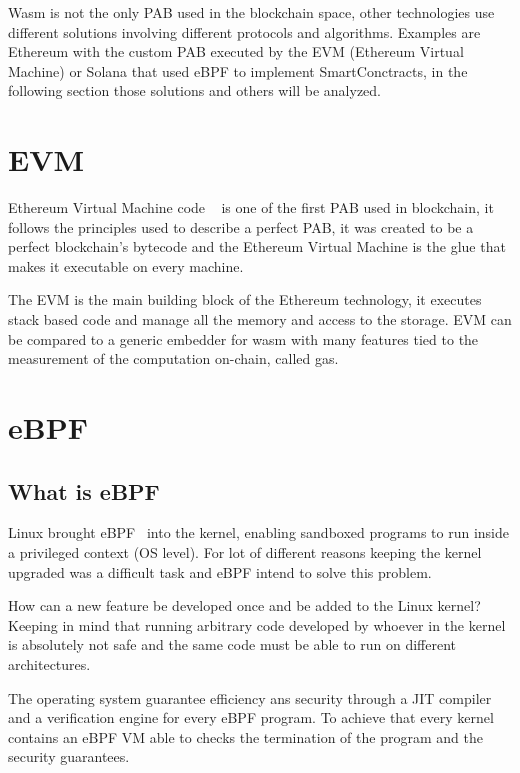 Wasm is not the only PAB used in the blockchain space, other technologies use different solutions involving different protocols and algorithms. Examples are Ethereum with the custom PAB executed by the EVM (Ethereum Virtual Machine) or Solana that used eBPF to implement SmartConctracts, in the following section those solutions and others will be analyzed.

\section{EVM}

Ethereum Virtual Machine code ~\cite{buterin2014next} is one of the first PAB used in blockchain, it follows the principles used to describe a perfect PAB, it was created to be a perfect blockchain's bytecode and the Ethereum Virtual Machine is the glue that makes it executable on every machine.

The EVM is the main building block of the Ethereum technology, it executes stack based code and manage all the memory and access to the storage. EVM can be compared to a generic embedder for wasm with many features tied to the measurement of the computation on-chain, called gas.

\section{eBPF}

\subsection{What is eBPF}

Linux brought eBPF~\cite{ebpf} into the kernel, enabling sandboxed programs to run inside a privileged context (OS level). For lot of different reasons keeping the kernel upgraded was a difficult task and eBPF intend to solve this problem.

How can a new feature be developed once and be added to the Linux kernel? Keeping in mind that running arbitrary code developed by whoever in the kernel is absolutely not safe and the same code must be able to run on different architectures.

The operating system guarantee efficiency ans security through a JIT compiler and a verification engine for every eBPF program. To achieve that every kernel contains an eBPF VM able to checks the termination of the program and the security guarantees.

